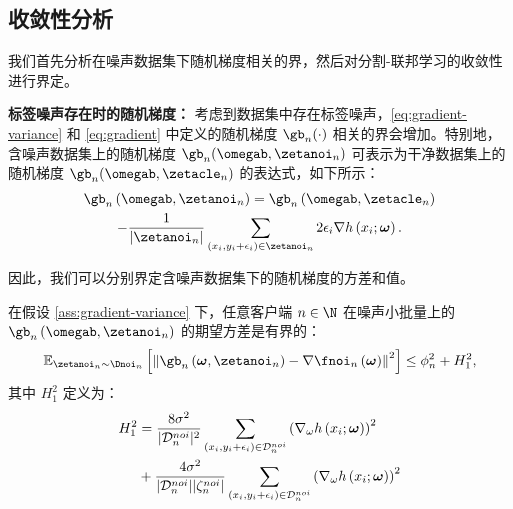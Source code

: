 \subsection{收敛性分析}\label{proofC}
我们首先分析在噪声数据集下随机梯度相关的界，然后对分割-联邦学习的收敛性进行界定。

\textbf{标签噪声存在时的随机梯度：} 考虑到数据集中存在标签噪声，\eqref{eq:gradient-variance} 和 \eqref{eq:gradient} 中定义的随机梯度 $\gb_n(\cdot)$ 相关的界会增加。特别地，含噪声数据集上的随机梯度 $\gb_n(\omegab,\zetanoi_n)$ 可表示为干净数据集上的随机梯度 $\gb_n(\omegab,\zetacle_n)$ 的表达式，如下所示：
\begin{multline}\label{Gradient of clean loss}
\gb_n\left(\omegab,\zetanoi_n\right) %
=\gb_n\left(\omegab,\zetacle_n\right)\\
-\frac{1}{|\zetanoi_n|}\sum_{\left(x_i,y_i+\epsilon_i\right)\in \zetanoi_n}2\epsilon_i \nabla h\left(x_i;\boldsymbol{\omega}\right).
\end{multline}

因此，我们可以分别界定含噪声数据集下的随机梯度的方差和值。

\begin{proposition}[均方差损失下含标签噪声的随机梯度的方差]\label{prop:variance-g mse}
在假设 \ref{ass:gradient-variance} 下，任意客户端 $n\in\N$ 在噪声小批量上的 $\gb_n\left(\omegab,\zetanoi_n\right)$ 的期望方差是有界的：
\begin{equation}\label{bounded-variance with noise}
     \mathbb{E}_{\zetanoi_n\sim \Dnoi_n}\left[\left\Vert \gb_n\left(\boldsymbol{\omega},\zetanoi_n\right) - \nabla \fnoi_n\left(\boldsymbol{\omega}\right) \right\Vert^2 \right] \leq \phi_n^2+H_1^2,
\end{equation}
其中 $H_1^2$ 定义为：
\begin{align}\label{eq:H}
    H_1^2 &= \frac{8\sigma^2}{|\mathcal{D}_n^{noi}|^2}\sum_{\left(x_{i},y_{i}+\epsilon_{i}\right)\in \mathcal{D}_n^{noi}}\left(
\nabla_\omega  h\left(x_{i};\boldsymbol{\omega}\right)\right)^2 \notag\\
    &+\frac{4\sigma^2}{|\mathcal{D}_n^{noi}||\zeta_n^{noi}|}\sum_{\left(x_{i},y_{i}+\epsilon_{i}\right)\in \mathcal{D}_n^{noi}}\left(
\nabla_\omega  h\left(x_{i};\boldsymbol{\omega}\right)\right)^2
\end{align}
\end{proposition}

